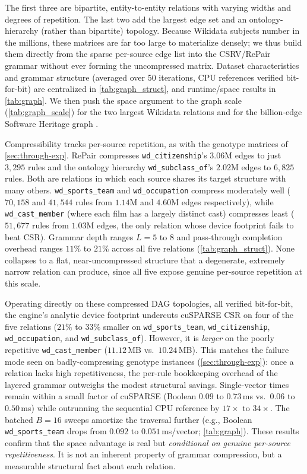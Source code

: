\documentclass[twoside,leqno,twocolumn]{article}
\begin{document}
The first three are bipartite, entity-to-entity relations with varying widths and degrees of repetition. The last two add the largest edge set and an ontology-hierarchy (rather than bipartite) topology. Because Wikidata subjects \cite{wikidata-survey,wikidata-cacm,wikidata-making} number in the millions, these matrices are far too large to materialize densely; we thus build them directly from the sparse per-source edge list into the CSRV/RePair grammar without ever forming the uncompressed matrix. Dataset characteristics and grammar structure (averaged over 50 iterations, CPU references verified bit-for-bit) are centralized in \cref{tab:graph_struct}, and runtime/space results in \cref{tab:graph}. We then push the space argument to the graph scale (\cref{tab:graph_scale}) for the two largest Wikidata relations and for the billion-edge Software Heritage graph \cite{swh_dag}.

Compressibility tracks per-source repetition, as with the genotype matrices of \cref{sec:through-exp}. RePair compresses \texttt{wd\_citizenship}'s $3.06$M edges to just $3{,}295$ rules and the ontology hierarchy \texttt{wd\_subclass\_of}'s $2.02$M edges to $6{,}825$ rules. Both are relations in which each source shares its target structure with many others. \texttt{wd\_sports\_team} and \texttt{wd\_occupation} compress moderately well ($70{,}158$ and $41{,}544$ rules from $1.14$M and $4.60$M edges respectively), while \texttt{wd\_cast\_member} (where each film has a largely distinct cast) compresses least ($51{,}677$ rules from $1.03$M edges, the only relation whose device footprint fails to beat CSR). Grammar depth ranges $L=5$ to $8$ and pass-through completion overhead ranges $11\%$ to $21\%$ across all five relations (\cref{tab:graph_struct}). None collapses to a flat, near-uncompressed structure that a degenerate, extremely narrow relation can produce, since all five expose genuine per-source repetition at this scale.

Operating directly on these compressed DAG topologies, all verified bit-for-bit, the engine's analytic device footprint undercuts cuSPARSE CSR on four of the five relations ($21\%$ to $33\%$ smaller on \texttt{wd\_sports\_team}, \texttt{wd\_citizenship}, \texttt{wd\_occupation}, and \texttt{wd\_subclass\_of}). However, it is \emph{larger} on the poorly repetitive \texttt{wd\_cast\_member} ($11.12$\,MB vs.\ $10.24$\,MB). This matches the failure mode seen on badly-compressing genotype instances (\cref{sec:through-exp}): once a relation lacks high repetitiveness, the per-rule bookkeeping overhead of the layered grammar outweighs the modest structural savings. Single-vector times remain within a small factor of cuSPARSE (Boolean $0.09$ to $0.73$\,ms vs.\ $0.06$ to $0.50$\,ms) while outrunning the sequential CPU reference by $17\times$ to $34\times$. The batched $B{=16}$ sweeps amortize the traversal further (e.g., Boolean \texttt{wd\_sports\_team} drops from $0.092$ to $0.051$\,ms/vector; \cref{tab:graph}). These results confirm that the space advantage is real but \emph{conditional on genuine per-source repetitiveness}. It is not an inherent property of grammar compression, but a measurable structural fact about each relation.
\end{document}
